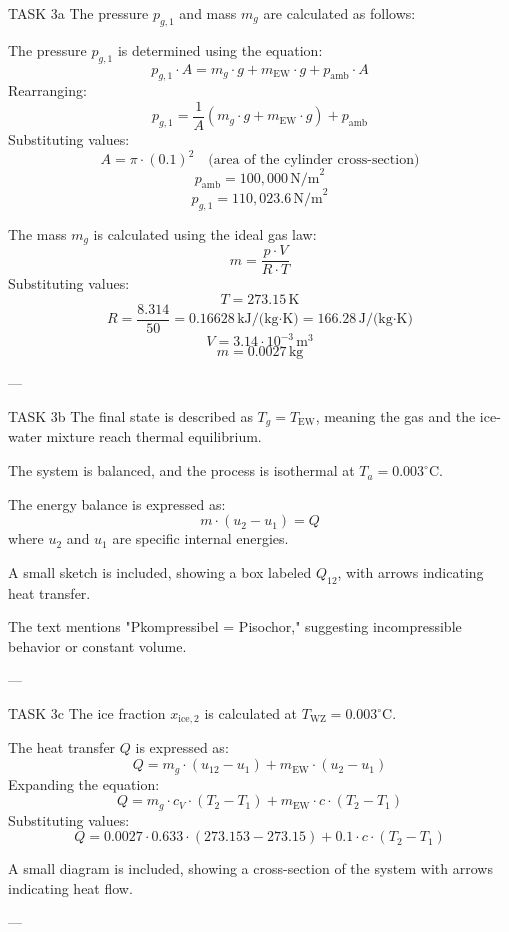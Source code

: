 TASK 3a  
The pressure \( p_{g,1} \) and mass \( m_g \) are calculated as follows:  

The pressure \( p_{g,1} \) is determined using the equation:  
\[
p_{g,1} \cdot A = m_g \cdot g + m_{\text{EW}} \cdot g + p_{\text{amb}} \cdot A
\]  
Rearranging:  
\[
p_{g,1} = \frac{1}{A} \left( m_g \cdot g + m_{\text{EW}} \cdot g \right) + p_{\text{amb}}
\]  
Substituting values:  
\[
A = \pi \cdot (0.1)^2 \quad \text{(area of the cylinder cross-section)}  
\]  
\[
p_{\text{amb}} = 100,000 \, \text{N/m}^2  
\]  
\[
p_{g,1} = 110,023.6 \, \text{N/m}^2  
\]  

The mass \( m_g \) is calculated using the ideal gas law:  
\[
m = \frac{p \cdot V}{R \cdot T}
\]  
Substituting values:  
\[
T = 273.15 \, \text{K}  
\]  
\[
R = \frac{8.314}{50} = 0.16628 \, \text{kJ/(kg·K)} = 166.28 \, \text{J/(kg·K)}  
\]  
\[
V = 3.14 \cdot 10^{-3} \, \text{m}^3  
\]  
\[
m = 0.0027 \, \text{kg}  
\]  

---

TASK 3b  
The final state is described as \( T_g = T_{\text{EW}} \), meaning the gas and the ice-water mixture reach thermal equilibrium.  

The system is balanced, and the process is isothermal at \( T_a = 0.003^\circ \text{C} \).  

The energy balance is expressed as:  
\[
m \cdot (u_2 - u_1) = Q  
\]  
where \( u_2 \) and \( u_1 \) are specific internal energies.  

A small sketch is included, showing a box labeled \( Q_{12} \), with arrows indicating heat transfer.  

The text mentions "Pkompressibel = Pisochor," suggesting incompressible behavior or constant volume.  

---

TASK 3c  
The ice fraction \( x_{\text{ice},2} \) is calculated at \( T_{\text{WZ}} = 0.003^\circ \text{C} \).  

The heat transfer \( Q \) is expressed as:  
\[
Q = m_g \cdot (u_{12} - u_{1}) + m_{\text{EW}} \cdot (u_{2} - u_{1})
\]  
Expanding the equation:  
\[
Q = m_g \cdot c_V \cdot (T_2 - T_1) + m_{\text{EW}} \cdot c \cdot (T_2 - T_1)
\]  
Substituting values:  
\[
Q = 0.0027 \cdot 0.633 \cdot (273.153 - 273.15) + 0.1 \cdot c \cdot (T_2 - T_1)
\]  

A small diagram is included, showing a cross-section of the system with arrows indicating heat flow.  

---